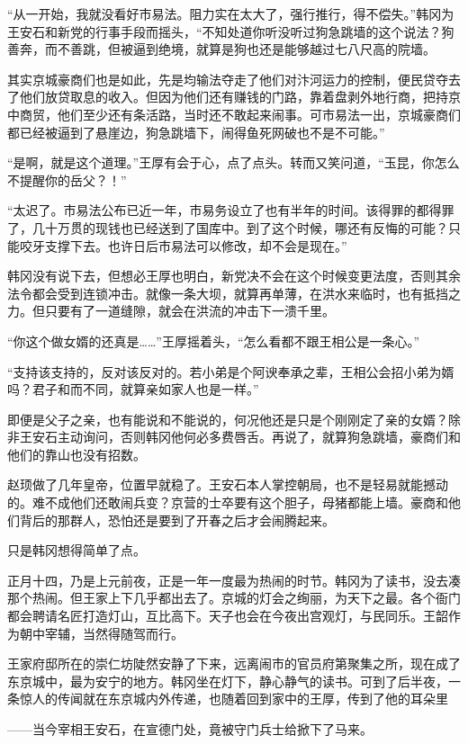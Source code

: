“从一开始，我就没看好市易法。阻力实在太大了，强行推行，得不偿失。”韩冈为王安石和新党的行事手段而摇头，“不知处道你听没听过狗急跳墙的这个说法？狗善奔，而不善跳，但被逼到绝境，就算是狗也还是能够越过七八尺高的院墙。

其实京城豪商们也是如此，先是均输法夺走了他们对汴河运力的控制，便民贷夺去了他们放贷取息的收入。但因为他们还有赚钱的门路，靠着盘剥外地行商，把持京中商贸，他们至少还有条活路，当时还不敢起来闹事。可市易法一出，京城豪商们都已经被逼到了悬崖边，狗急跳墙下，闹得鱼死网破也不是不可能。”

“是啊，就是这个道理。”王厚有会于心，点了点头。转而又笑问道，“玉昆，你怎么不提醒你的岳父？！”

“太迟了。市易法公布已近一年，市易务设立了也有半年的时间。该得罪的都得罪了，几十万贯的现钱也已经送到了国库中。到了这个时候，哪还有反悔的可能？只能咬牙支撑下去。也许日后市易法可以修改，却不会是现在。”

韩冈没有说下去，但想必王厚也明白，新党决不会在这个时候变更法度，否则其余法令都会受到连锁冲击。就像一条大坝，就算再单薄，在洪水来临时，也有抵挡之力。但只要有了一道缝隙，就会在洪流的冲击下一溃千里。

“你这个做女婿的还真是……”王厚摇着头，“怎么看都不跟王相公是一条心。”

“支持该支持的，反对该反对的。若小弟是个阿谀奉承之辈，王相公会招小弟为婿吗？君子和而不同，就算亲如家人也是一样。”

即便是父子之亲，也有能说和不能说的，何况他还是只是个刚刚定了亲的女婿？除非王安石主动询问，否则韩冈他何必多费唇舌。再说了，就算狗急跳墙，豪商们和他们的靠山也没有招数。

赵顼做了几年皇帝，位置早就稳了。王安石本人掌控朝局，也不是轻易就能撼动的。难不成他们还敢闹兵变？京营的士卒要有这个胆子，母猪都能上墙。豪商和他们背后的那群人，恐怕还是要到了开春之后才会闹腾起来。

只是韩冈想得简单了点。

正月十四，乃是上元前夜，正是一年一度最为热闹的时节。韩冈为了读书，没去凑那个热闹。但王家上下几乎都出去了。京城的灯会之绚丽，为天下之最。各个衙门都会聘请名匠打造灯山，互比高下。天子也会在今夜出宫观灯，与民同乐。王韶作为朝中宰辅，当然得随驾而行。

王家府邸所在的崇仁坊陡然安静了下来，远离闹市的官员府第聚集之所，现在成了东京城中，最为安宁的地方。韩冈坐在灯下，静心静气的读书。可到了后半夜，一条惊人的传闻就在东京城内外传递，也随着回到家中的王厚，传到了他的耳朵里

——当今宰相王安石，在宣德门处，竟被守门兵士给掀下了马来。

